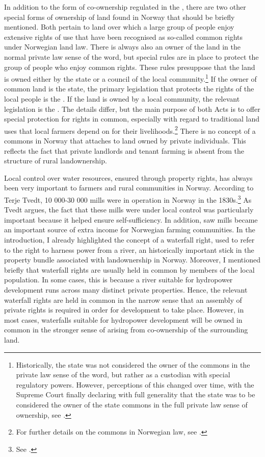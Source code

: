 In addition to the form of co-ownership regulated in the \cite{coa65}, there are two other special forms of ownership of land found in Norway that should be briefly mentioned. Both pertain to land over which a large group of people enjoy extensive rights of use that have been recognised as so-called common rights under Norwegian land law. There is always also an owner of the land in the normal private law sense of the word, but special rules are in place to protect the group of people who enjoy common rights. These rules presuppose that the land is owned either by the state or a council of the local community.\footnote{Historically, the state was not considered the owner of the commons in the private law sense of the word, but rather as a custodian with special regulatory powers. However, perceptions of this changed over time, with the Supreme Court finally declaring with full generality that the state was to be considered the owner of the state commons in the full private law sense of ownership, see \cite{vinstra63}.}  If the owner of common land is the state, the primary legislation that protects the rights of the local people is the \cite{ma75}. If the land is owned by a local community, the relevant legislation is the \cite{vca92}. The details differ, but the main purpose of both Acts is to offer special protection for rights in common, especially with regard to traditional land uses that local farmers depend on for their livelihoods.\footnote{For further details on the commons in Norwegian law, see \cite{stenseth07a}.} There is no concept of a commons in Norway that attaches to land owned by private individuals. This reflects the fact that private landlords and tenant farming is absent from the structure of rural landownership.

Local control over water resources, ensured through property rights, has always been very important to farmers and rural communities in Norway. According to Terje Tvedt, 10 000-30 000 mills were in operation in Norway in the 1830s.\footnote{See \cite[121]{tvedt13}.} As Tvedt argues, the fact that these mills were under local control was particularly important because it helped ensure self-sufficiency. In addition, saw mills became an important source of extra income for Norwegian farming communities. In the introduction, I already highlighted the concept of a waterfall right, used to refer to the right to harness power from a river, an historically important stick in the property bundle associated with landownership in Norway. Moreover, I mentioned briefly that waterfall rights are usually held in common by members of the local population. In some cases, this is because a river suitable for hydropower development runs across many distinct private properties. Hence, the relevant waterfall rights are held in common in the narrow sense that an assembly of private rights is required in order for development to take place. However, in most cases, waterfalls suitable for hydropower development will be owned in common in the stronger sense of arising from co-ownership of the surrounding land. %

